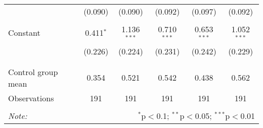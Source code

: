 \begin{tabular}{@{\extracolsep{5pt}}lccccc}
  & (0.090) & (0.090) & (0.092) & (0.097) & (0.092) \\ 
  & & & & & \\ 
 Constant & 0.411$^{*}$ & 1.136$^{***}$ & 0.710$^{***}$ & 0.653$^{***}$ & 1.052$^{***}$ \\ 
  & (0.226) & (0.224) & (0.231) & (0.242) & (0.229) \\ 
  & & & & & \\ 
\hline \\[-1.8ex] 
Control group mean & 0.354 & 0.521 & 0.542 & 0.438 & 0.562 \\ 
Observations & 191 & 191 & 191 & 191 & 191 \\ 
\hline 
\hline \\[-1.8ex] 
\textit{Note:}  & \multicolumn{5}{r}{$^{*}$p$<$0.1; $^{**}$p$<$0.05; $^{***}$p$<$0.01} \\ 
\end{tabular} 
